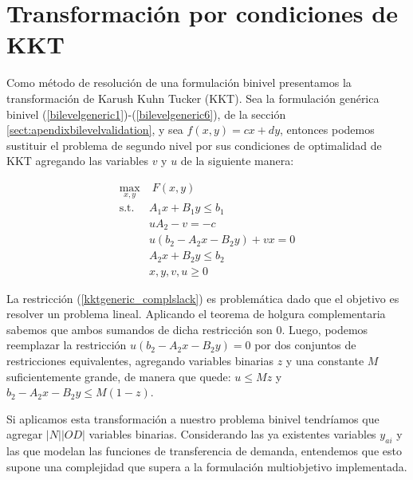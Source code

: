\section{Transformación por condiciones de KKT}
\label{sec:kkttransform}

Como método de resolución de una formulación binivel presentamos la transformación de Karush Kuhn Tucker (KKT)\parencite{bardbookch5}. Sea la formulación genérica binivel (\ref{bilevelgeneric1})-(\ref{bilevelgeneric6}), de la sección \ref{sect:apendixbilevelvalidation}, y sea $f(x, y) = cx + dy$, entonces podemos sustituir el problema de segundo nivel por sus condiciones de optimalidad de KKT agregando las variables $v$ y $u$ de la siguiente manera:

\begin{align}
\max_{x,y}              & \; F(x, y) \label{kktgeneric1} \\
\text{s.t.}             & A_1 x + B_1 y \leq b_1 \\
                        & uA_2 - v = -c \\
                        & u(b_2 - A_2x - B_2y) + vx = 0 \label{kktgeneric_complslack} \\
                        & A_2 x + B_2 y \leq b_2 \label{kktgeneric5} \\
                        & x, y, v, u \geq 0 \label{kktgeneric6}
\end{align}

La restricción (\ref{kktgeneric_complslack}) es problemática dado que el objetivo es resolver un problema lineal. Aplicando el teorema de holgura complementaria sabemos que ambos sumandos de dicha restricción son 0. Luego, podemos reemplazar la restricción $u(b_2 - A_2x - B_2y) = 0$ por dos conjuntos de restricciones equivalentes, agregando variables binarias $z$ y una constante $M$ suficientemente grande, de manera que quede: $u \leq Mz$ y $b_2 - A_2x - B_2y \leq M(1-z)$.

Si aplicamos esta transformación a nuestro problema binivel tendríamos que agregar $|N| |OD|$ variables binarias. Considerando las ya existentes variables $y_{ai}$ y las que modelan las funciones de transferencia de demanda, entendemos que esto supone una complejidad que supera a la formulación multiobjetivo implementada.
